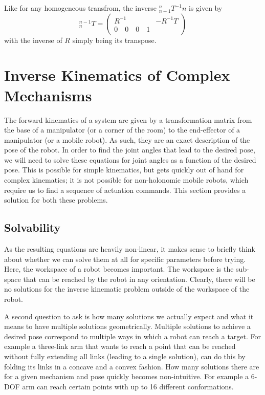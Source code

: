 Like for any homogeneous transfrom, the inverse $_{n-1}^nT^{-1}n$ is given by
\begin{equation}
^{n-1}_nT=\left(
\begin{array}{c|c}
R^{-1} & -R^{-1}T\\
\hline
0 \quad 0 \quad 0 \quad 1
\end{array}
\right)
\end{equation}
with the inverse of $R$ simply being its transpose.

\section{Inverse Kinematics of Complex Mechanisms}\label{sec:advinvkinematics}
The forward kinematics of a system are given by a transformation matrix from the base of a manipulator (or a corner of the room) to the end-effector of a manipulator (or a mobile robot). As such, they are an exact description of the pose of the robot. In order to find the joint angles that lead to the desired pose, we will need to solve these equations for joint angles as a function of the desired pose. This is possible for simple kinematics, but gets quickly out of hand for complex kinematics; it is not possible for non-holonomic mobile robots, which require us to find a sequence of actuation commands. This section provides a solution for both these problems.

\subsection{Solvability}
As the resulting equations are heavily non-linear, it makes sense to briefly think about whether we can solve them at all for specific parameters before trying. Here, the workspace of a robot becomes important. The workspace is the sub-space that can be reached by the robot in any orientation. Clearly, there will be no solutions for the inverse kinematic problem outside of the workspace of the robot.

A second question to ask is how many solutions we actually expect and what it means to have multiple solutions geometrically. Multiple solutions to achieve a desired pose correspond to multiple ways in which a robot can reach a target. For example a three-link arm that wants to reach a point that can be reached without fully extending all links (leading to a single solution), can do this by  folding its links in a concave and a convex fashion. How many solutions there are for a given mechanism and pose quickly becomes non-intuitive. For example a 6-DOF arm can reach certain points with up to 16 different conformations.


